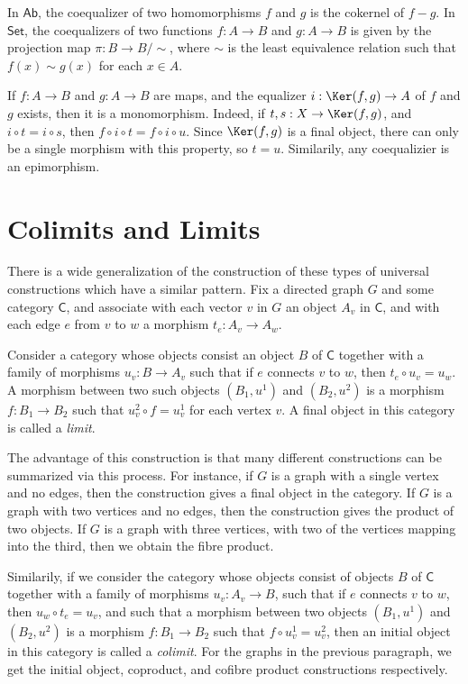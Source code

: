 \begin{example}
    In $\mathsf{Ab}$, the coequalizer of two homomorphisms $f$ and $g$ is the cokernel of $f - g$. In $\mathsf{Set}$, the coequalizers of two functions $f: A \to B$ and $g: A \to B$ is given by the projection map $\pi: B \to B/\sim$, where $\sim$ is the least equivalence relation such that $f(x) \sim g(x)$ for each $x \in A$.
\end{example}

If $f: A \to B$ and $g: A \to B$ are maps, and the equalizer $i: \Ker(f,g) \to A$ of $f$ and $g$ exists, then it is a monomorphism. Indeed, if $t,s: X \to \Ker(f,g)$, and $i \circ t = i \circ s$, then $f \circ i \circ t = f \circ i \circ u$. Since $\Ker(f,g)$ is a final object, there can only be a single morphism with this property, so $t = u$. Similarily, any coequalizier is an epimorphism.



\section{Colimits and Limits}

There is a wide generalization of the construction of these types of universal constructions which have a similar pattern. Fix a directed graph $G$ and some category $\mathsf{C}$, and associate with each vector $v$ in $G$ an object $A_v$ in $\mathsf{C}$, and with each edge $e$ from $v$ to $w$ a morphism $t_e: A_v \to A_w$.

Consider a category whose objects consist an object $B$ of $\mathsf{C}$ together with a family of morphisms $u_v: B \to A_v$ such that if $e$ connects $v$ to $w$, then $t_e \circ u_v = u_w$. A morphism between two such objects $(B_1,u^1)$ and $(B_2,u^2)$ is a morphism $f: B_1 \to B_2$ such that $u_v^2 \circ f = u_v^1$ for each vertex $v$. A final object in this category is called a \emph{limit}.

The advantage of this construction is that many different constructions can be summarized via this process. For instance, if $G$ is a graph with a single vertex and no edges, then the construction gives a final object in the category. If $G$ is a graph with two vertices and no edges, then the construction gives the product of two objects. If $G$ is a graph with three vertices, with two of the vertices mapping into the third, then we obtain the fibre product.

Similarily, if we consider the category whose objects consist of objects $B$ of $\mathsf{C}$ together with a family of morphisms $u_v: A_v \to B$, such that if $e$ connects $v$ to $w$, then $u_w \circ t_e = u_v$, and such that a morphism between two objects $(B_1,u^1)$ and $(B_2,u^2)$ is a morphism $f: B_1 \to B_2$ such that $f \circ u^1_v = u^2_v$, then an initial object in this category is called a \emph{colimit}. For the graphs in the previous paragraph, we get the initial object, coproduct, and cofibre product constructions respectively.








